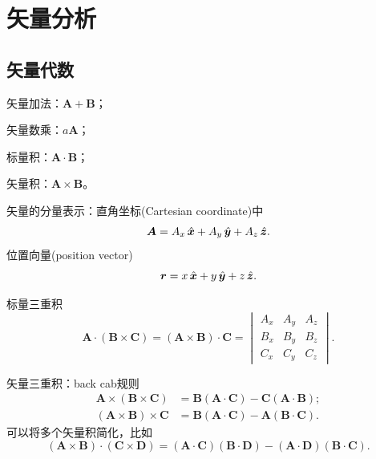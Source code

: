 
\chapter{矢量分析}
\label{chap:vector analysis}

\section{矢量代数}
\label{sec:vector algebra}

\begin{compactitem}
    \item 矢量加法：$\bm A + \bm B$；
    \item 矢量数乘：$a\bm A$；
    \item 标量积：$\bm A \cdot \bm B$；
    \item 矢量积：$\bm A \times \bm B$。
	\item 矢量的分量表示：直角坐标(Cartesian coordinate)中
	\begin{equation}
        \bm A = A_x\mathop{}\!\hat{\bm{x}} + A_y\mathop{}\!\hat{\bm{y}} + A_z\mathop{}\!\hat{\bm{z}}.
    \end{equation}
    位置向量(position vector)
    \begin{equation}
        \bm r = x\mathop{}\!\hat{\bm{x}} + y\mathop{}\!\hat{\bm{y}} + z\mathop{}\!\hat{\bm{z}}.
    \end{equation}
	\item 标量三重积
    \begin{equation}
        \bm A \cdot (\bm B \times \bm C) = (\bm A \times \bm B) \cdot \bm C
        = \begin{vmatrix}
            A_x&A_y&A_z\\
            B_x&B_y&B_z\\
            C_x&C_y&C_z
        \end{vmatrix}.
    \end{equation}
    \item 矢量三重积：back cab规则
    \begin{subequations}
        \begin{align}
            \label{eqn:bac-cab}
            \bm A \times (\bm B \times \bm C) &= \bm B(\bm A \cdot \bm C) - \bm C(\bm A \cdot \bm B);\\
            (\bm A \times \bm B) \times \bm C &= \bm B(\bm A \cdot \bm C) - \bm A(\bm B \cdot \bm C).
        \end{align}
    \end{subequations}
    可以将多个矢量积简化，比如
    \begin{equation}
        \label{eq:ed-lagrange-vector-product}
        (\bm A \times \bm B) \cdot (\bm C \times \bm D) = (\bm A \cdot \bm C)(\bm B \cdot \bm D) - (\bm A \cdot \bm D)(\bm B \cdot \bm C).
    \end{equation}
\end{compactitem}


